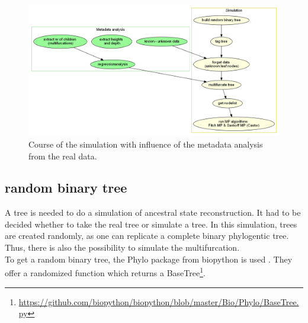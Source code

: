     \begin{figure}[h!]
      \centering
      \includegraphics[width=1\textwidth]{Figures/Workflow-Simulation.png}
      \caption{Course of the simulation with influence of the metadata analysis from the real data.}
      \label{fig:Simulation Workflow}
    \end{figure}



    \subsection{random binary tree}
      A tree is needed to do a simulation of ancestral state reconstruction. It had to be decided whether 
        to take the real tree or simulate a tree. In this simulation, trees are created randomly, as 
        one can replicate a complete binary phylogentic tree. Thus, there is also the possibility to 
        simulate the multifurcation. \\
      
      To get a random binary tree, the Phylo package from biopython is used \cite{Cock2009}. They offer 
        a randomized function which returns a BaseTree\footnote{
          \hyperlink{https://github.com/biopython/biopython/blob/master/Bio/Phylo/BaseTree.py}
          {https://github.com/biopython/biopython/blob/master/Bio/Phylo/BaseTree.py}
        }. \\

